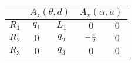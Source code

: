 \begin{tabular}{c|c|c|c|c|}  
            \cline{2-5} &
            \multicolumn{2}{|c|}{$A_z(\theta,d)$} &
            \multicolumn{2}{|c|}{$A_x(\alpha,a)$} \\
            \hline
        \multicolumn{1}{|c|}{$R_1$} & $q_{1}$ & $L_{1}$ & $0$ & $0$ \\
            \hline
        \multicolumn{1}{|c|}{$R_2$} & $0$ & $q_{2}$ & $-{{\pi}\over{2}}$ & $0$ \\
            \hline
        \multicolumn{1}{|c|}{$R_3$} & $0$ & $q_{3}$ & $0$ & $0$ \\
            \hline
\end{tabular}
